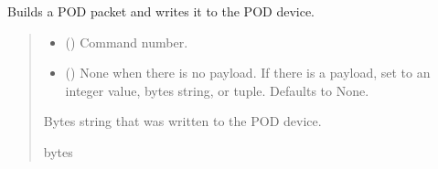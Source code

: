 \documentclass[letterpaper,10pt,english]{sphinxmanual}
\begin{document}
\begin{fulllineitems}
\begin{fulllineitems}
\label{\detokenize{PodDevice_8229:PodDevice_8229.POD_8229.WritePacket}}
\pysigstartsignatures
{}
\pysigstopsignatures
\sphinxAtStartPar
Builds a POD packet and writes it to the POD device.
\begin{quote}\begin{description}
\begin{itemize}
\item {} 
\sphinxAtStartPar
{} (\sphinxstyleliteralemphasis{\sphinxupquote{ | }}) \textendash{} Command number.

\item {} 
\sphinxAtStartPar
{} (\sphinxstyleliteralemphasis{\sphinxupquote{ | }}\sphinxstyleliteralemphasis{\sphinxupquote{ | }}\sphinxstyleliteralemphasis{\sphinxupquote{{[}}}\sphinxstyleliteralemphasis{\sphinxupquote{ | }}\sphinxstyleliteralemphasis{\sphinxupquote{{]}}}\sphinxstyleliteralemphasis{\sphinxupquote{, }}) \textendash{} None when there is no payload. If there                 is a payload, set to an integer value, bytes string, or tuple. Defaults to None.

\end{itemize}

\sphinxAtStartPar
Bytes string that was written to the POD device.

\sphinxAtStartPar
bytes


\end{description}
\end{quote}
\end{fulllineitems}
\end{fulllineitems}
\end{document}
